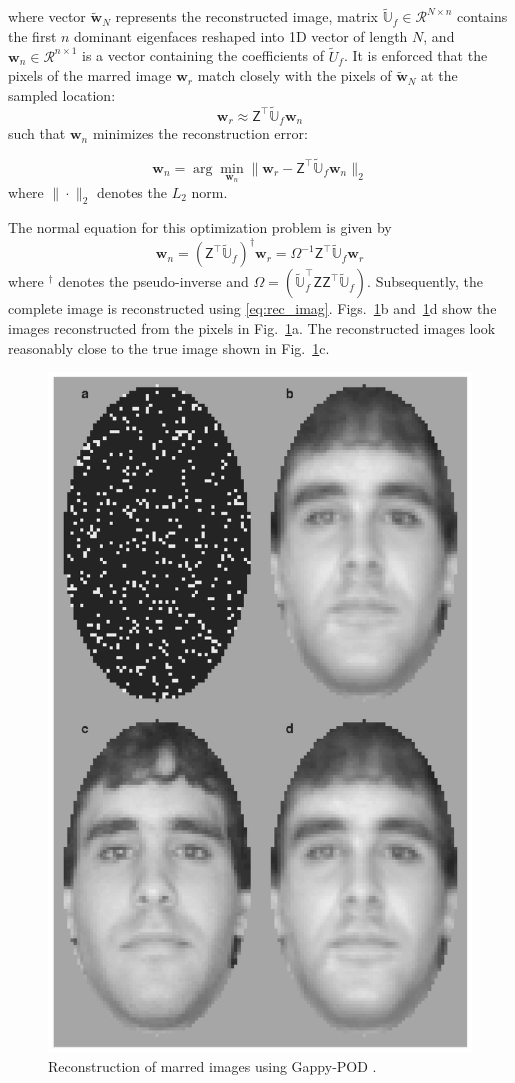 \documentclass[11pt]{article}
\renewcommand{\vec}[1]{\mathbf{#1}}
\newcommand{\mat}[1]{\mathsf{#1}}
\begin{document}
where vector $\widetilde{\vec{w}}_N$ represents the reconstructed image, matrix $\widetilde{\mathbb{U}}_f\in \mathcal{R}^{N\times n}$ contains the first $n$ dominant eigenfaces reshaped into 1D vector of length $N$, and $\vec{w}_n\in\mathcal{R}^{n\times 1}$ is a vector containing the coefficients of $\widetilde{U}_f$.
It is enforced that the pixels of the marred image $\vec{w}_r$ match closely with the pixels of $\widetilde{\vec{w}}_N$ at the sampled location:
\begin{equation}
{\vec{w}}_r \approx \mat{Z}^{\top}\widetilde{\mathbb{U}}_f\vec{w}_n
\end{equation}
such that $\vec{w}_n$ minimizes the  reconstruction error:

\begin{equation}
   \vec{w}_n = \arg\min_{\vec{w}_n} \| \vec{w}_r - \mat{Z}^{\top}\widetilde{\mathbb{U}}_f\vec{w}_n \|_2
   \label{eq:sampling_optimization}
\end{equation}
where $\|\cdot\|_2$ denotes the $L_2$ norm.


The normal equation for this optimization problem is given by
\begin{equation}
 {\vec{w}_n} = \left(\mat{Z}^{\top}\widetilde{\mathbb{U}}_f\right)^{\dagger}\vec{w}_r = \Omega^{-1}\mat{Z}^{\top}\widetilde{\mathbb{U}}_f\vec{w}_r
\label{eq:solution_ak}
\end{equation}
where $^{\dagger}$ denotes the pseudo-inverse and $\Omega = \left(\widetilde{\mathbb{U}}_f^{\top}\mat{Z}\mat{Z}^{\top}\widetilde{\mathbb{U}}_f\right)$.
Subsequently, the complete image is reconstructed using \cref{eq:rec_imag}.
Figs.~\ref{fig:pic_db}b and~\ref{fig:pic_db}d show the images reconstructed from the pixels in Fig.~\ref{fig:pic_db}a.
The reconstructed images look reasonably close to the true image shown in Fig.~\ref{fig:pic_db}c.



\begin{figure}[t!]
    \centering
    \includegraphics[width=0.25\linewidth]{gappy_pod2.jpg}
    \caption{Reconstruction of marred images using Gappy-POD \cite{sirovich1987low-dimensional}.}
\label{fig:pic_db}
\end{figure}
\end{document}
